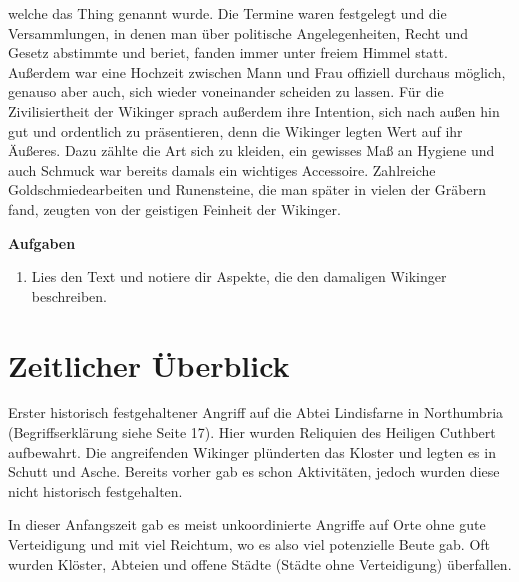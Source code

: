 \documentclass[12pt,a4paper,ngerman,openany]{book}
\newcommand{\aufgaben}[1]{
  \begin{tcolorbox}
    \textbf{Aufgaben}
    \begin{enumerate}
      #1
    \end{enumerate}
  \end{tcolorbox}
} %
\begin{document}
welche das \glqq Thing\grqq{} genannt wurde. Die Termine waren festgelegt und die Versammlungen, in denen man über politische Angelegenheiten, Recht und Gesetz abstimmte und beriet, fanden immer unter freiem Himmel statt.\\
Außerdem war eine Hochzeit zwischen Mann und Frau offiziell durchaus möglich, genauso aber auch, sich wieder voneinander scheiden zu lassen.
Für die Zivilisiertheit der Wikinger sprach außerdem ihre Intention, sich nach außen hin gut und ordentlich zu präsentieren, denn die Wikinger legten Wert auf ihr Äußeres. Dazu zählte die Art sich zu kleiden,
ein gewisses Maß an Hygiene und auch Schmuck war bereits damals ein wichtiges Accessoire. Zahlreiche Goldschmiedearbeiten und Runensteine, die man später in vielen der Gräbern fand, zeugten von der geistigen Feinheit der Wikinger.

\aufgaben {
  \item Lies den Text und notiere dir Aspekte, die den damaligen Wikinger beschreiben.
}

\section{Zeitlicher Überblick}

\begin{tcolorbox}[sharp corners, title=08. Juni 793]
Erster historisch festgehaltener Angriff auf die Abtei Lindisfarne in Northumbria (Begriffserklärung siehe Seite 17). Hier wurden Reliquien des Heiligen Cuthbert aufbewahrt. Die angreifenden Wikinger plünderten das Kloster und legten es in Schutt und Asche. Bereits vorher gab es schon Aktivitäten, jedoch wurden diese nicht historisch festgehalten.
\end{tcolorbox}

\begin{tcolorbox}[sharp corners, title=Ungefähr 800 bis 850]
In dieser Anfangszeit gab es meist unkoordinierte Angriffe auf Orte ohne gute Verteidigung und mit viel Reichtum, wo es also viel potenzielle Beute gab. Oft wurden Klöster, Abteien und offene Städte (Städte ohne Verteidigung) überfallen.
\end{tcolorbox}
\end{document}
